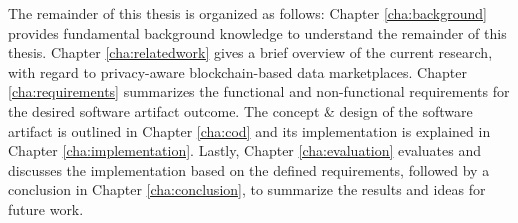 The remainder of this thesis is organized as follows: Chapter \ref{cha:background} provides fundamental background knowledge to understand the remainder of this thesis. Chapter \ref{cha:relatedwork} gives a brief overview of the current research, with regard to privacy-aware blockchain-based data marketplaces. Chapter \ref{cha:requirements} summarizes the functional and non-functional requirements for the desired software artifact outcome. The concept \& design of the software artifact is outlined in Chapter \ref{cha:cod} and its implementation is explained in Chapter \ref{cha:implementation}. Lastly, Chapter \ref{cha:evaluation} evaluates and discusses the implementation based on the defined requirements, followed by a conclusion in Chapter \ref{cha:conclusion}, to summarize the results and ideas for future work.



